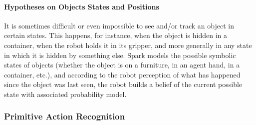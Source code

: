\documentclass[preprint,3p,times]{elsarticle}
\begin{document}
%
%

\paragraph{Hypotheses on Objects States and Positions}

It is sometimes difficult or even impossible to see and/or track an object in
certain states. This happens, for instance, when the object is hidden in a
container, when the robot holds it in its gripper, and more generally in any
state in which it is hidden by something else. {\sc Spark} models the possible
symbolic states of objects (whether the object is on a furniture, in an agent
hand, in a container, etc.), and according to the robot perception of what has
happened since the object was last seen, the robot builds a belief of the
current possible state with associated probability model.

\subsubsection{Primitive Action Recognition}
\end{document}
